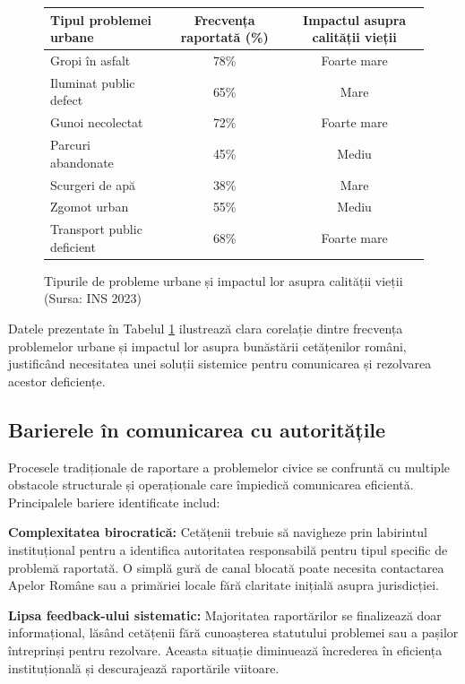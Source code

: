 \documentclass[12pt,a4paper]{report}
\begin{document}
\begin{figure}[H]
\centering
\begin{tabular}{|l|c|c|}
\hline
\textbf{Tipul problemei urbane} & \textbf{Frecvența raportată (\%)} & \textbf{Impactul asupra calității vieții} \\
\hline
Gropi în asfalt & 78\% & Foarte mare \\
\hline
Iluminat public defect & 65\% & Mare \\
\hline
Gunoi necolectat & 72\% & Foarte mare \\
\hline
Parcuri abandonate & 45\% & Mediu \\
\hline
Scurgeri de apă & 38\% & Mare \\
\hline
Zgomot urban & 55\% & Mediu \\
\hline
Transport public deficient & 68\% & Foarte mare \\
\hline
\end{tabular}
\caption{Tipurile de probleme urbane și impactul lor asupra calității vieții (Sursa: INS 2023)}
\label{tab:probleme_urbane}
\end{figure}

Datele prezentate în Tabelul \ref{tab:probleme_urbane} ilustrează clara corelație dintre frecvența problemelor urbane și impactul lor asupra bunăstării cetățenilor români, justificând necesitatea unei soluții sistemice pentru comunicarea și rezolvarea acestor deficiențe.
\subsection{Barierele în comunicarea cu autoritățile}

Procesele tradiționale de raportare a problemelor civice se confruntă cu multiple obstacole structurale și operaționale care împiedică comunicarea eficientă. Principalele bariere identificate includ:

\textbf{Complexitatea birocratică:} Cetățenii trebuie să navigheze prin labirintul instituțional pentru a identifica autoritatea responsabilă pentru tipul specific de problemă raportată. O simplă gură de canal blocată poate necesita contactarea Apelor Române sau  a primăriei locale fără claritate inițială asupra jurisdicției.

\textbf{Lipsa feedback-ului sistematic:} Majoritatea raportărilor se finalizează doar   informațional, lăsând cetățenii fără cunoașterea statutului problemei sau a pașilor întreprinși pentru rezolvare. Aceasta situație diminuează încrederea în eficiența instituțională și descurajează raportările viitoare.
\end{document}
